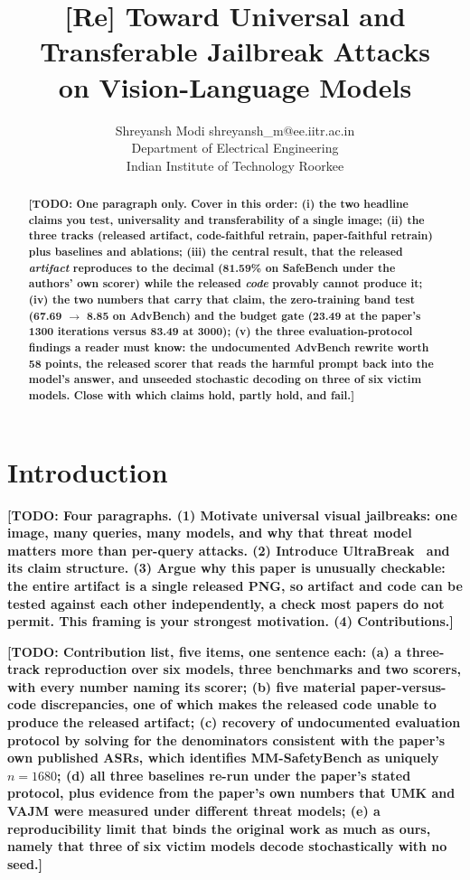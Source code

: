 \documentclass[10pt]{article} %
\title{[Re] Toward Universal and Transferable Jailbreak Attacks\\on Vision-Language Models}
\author{\name Shreyansh Modi \email shreyansh\_m@ee.iitr.ac.in \\
      \addr Department of Electrical Engineering\\
      Indian Institute of Technology Roorkee}
\newcommand{\todo}[1]{\textbf{[TODO: #1]}}
\begin{document}
\maketitle

\begin{abstract}
\todo{One paragraph only. Cover in this order: (i) the two headline claims you test, universality and
transferability of a single image; (ii) the three tracks (released artifact, code-faithful retrain,
paper-faithful retrain) plus baselines and ablations; (iii) the central result, that the released
\emph{artifact} reproduces to the decimal (81.59\% on SafeBench under the authors' own scorer) while
the released \emph{code} provably cannot produce it; (iv) the two numbers that carry that claim, the
zero-training band test (67.69 $\rightarrow$ 8.85 on AdvBench) and the budget gate (23.49 at the
paper's 1300 iterations versus 83.49 at 3000); (v) the three evaluation-protocol findings a reader
must know: the undocumented AdvBench rewrite worth 58 points, the released scorer that reads the
harmful prompt back into the model's answer, and unseeded stochastic decoding on three of six victim
models. Close with which claims hold, partly hold, and fail.}
\end{abstract}

\section{Introduction}
\label{sec:intro}

\todo{Four paragraphs. (1) Motivate universal visual jailbreaks: one image, many queries, many models,
and why that threat model matters more than per-query attacks. (2) Introduce
UltraBreak~\citep{cui2026ultrabreak} and its claim structure. (3) Argue why this paper is unusually
checkable: the entire artifact is a single released PNG, so artifact and code can be tested against
each other independently, a check most papers do not permit. This framing is your strongest
motivation. (4) Contributions.}

\todo{Contribution list, five items, one sentence each: (a) a three-track reproduction over six models,
three benchmarks and two scorers, with every number naming its scorer; (b) five material paper-versus-code
discrepancies, one of which makes the released code unable to produce the released artifact;
(c) recovery of undocumented evaluation protocol by solving for the denominators consistent with the
paper's own published ASRs, which identifies MM-SafetyBench as uniquely $n=1680$; (d) all three
baselines re-run under the paper's stated protocol, plus evidence from the paper's own numbers that
UMK and VAJM were measured under different threat models; (e) a reproducibility limit that binds the
original work as much as ours, namely that three of six victim models decode stochastically with no
seed.}
\end{document}
